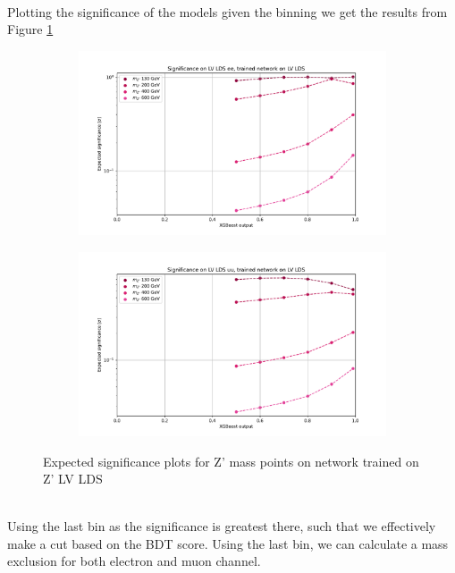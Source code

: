 \documentclass[12pt, a4paper]{book}
\begin{document}
\\Plotting the significance of the models given the binning we get the results from Figure \ref{fig:LV_LDS_exp_sig}
\begin{figure}[!ht]
	\centering
	\begin{subfigure}[b]{0.49\textwidth}
      \centering
      \includegraphics[width=1\textwidth]{XGBoost/LV_LDS/EXP_SIG_ee.pdf}
      \end{subfigure}
   \hfill
   \begin{subfigure}[b]{0.49\textwidth}
      \centering
      \includegraphics[width=1\textwidth]{XGBoost/LV_LDS/EXP_SIG_uu.pdf}
      \end{subfigure}
   \caption{Expected significance plots for Z' mass points on network trained on Z' LV LDS}\label{fig:LV_LDS_exp_sig}
\end{figure}
\\Using the last bin as the significance is greatest there, such that we effectively make a cut based on the BDT score. Using the last bin, we can calculate a mass exclusion for both electron and muon channel.\\
\end{document}
